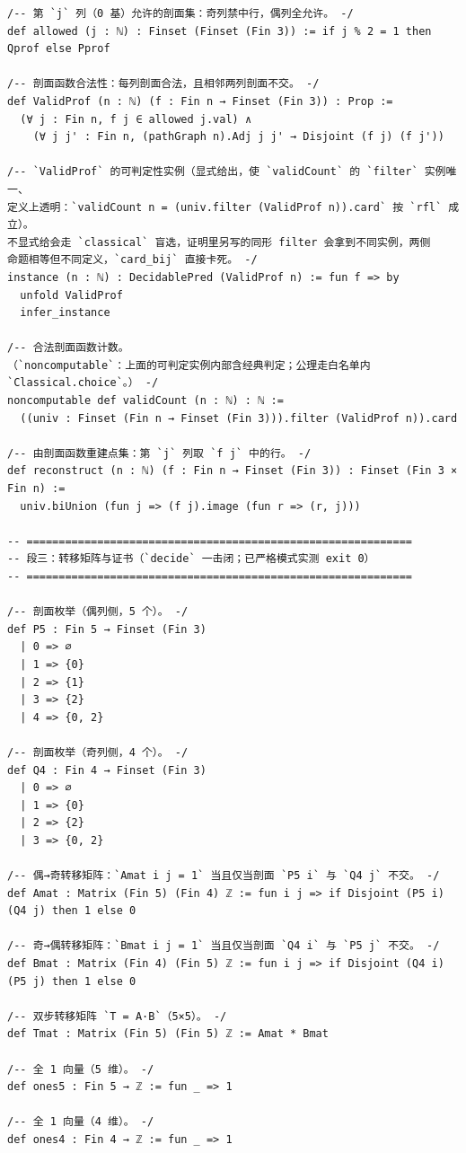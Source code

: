 \documentclass[11pt]{article}
\begin{document}
\begin{lstlisting}
/-- 第 `j` 列（0 基）允许的剖面集：奇列禁中行，偶列全允许。 -/
def allowed (j : ℕ) : Finset (Finset (Fin 3)) := if j % 2 = 1 then Qprof else Pprof

/-- 剖面函数合法性：每列剖面合法，且相邻两列剖面不交。 -/
def ValidProf (n : ℕ) (f : Fin n → Finset (Fin 3)) : Prop :=
  (∀ j : Fin n, f j ∈ allowed j.val) ∧
    (∀ j j' : Fin n, (pathGraph n).Adj j j' → Disjoint (f j) (f j'))

/-- `ValidProf` 的可判定性实例（显式给出，使 `validCount` 的 `filter` 实例唯一、
定义上透明：`validCount n = (univ.filter (ValidProf n)).card` 按 `rfl` 成立）。
不显式给会走 `classical` 盲选，证明里另写的同形 filter 会拿到不同实例，两侧
命题相等但不同定义，`card_bij` 直接卡死。 -/
instance (n : ℕ) : DecidablePred (ValidProf n) := fun f => by
  unfold ValidProf
  infer_instance

/-- 合法剖面函数计数。
（`noncomputable`：上面的可判定实例内部含经典判定；公理走白名单内 `Classical.choice`。） -/
noncomputable def validCount (n : ℕ) : ℕ :=
  ((univ : Finset (Fin n → Finset (Fin 3))).filter (ValidProf n)).card

/-- 由剖面函数重建点集：第 `j` 列取 `f j` 中的行。 -/
def reconstruct (n : ℕ) (f : Fin n → Finset (Fin 3)) : Finset (Fin 3 × Fin n) :=
  univ.biUnion (fun j => (f j).image (fun r => (r, j)))

-- ============================================================
-- 段三：转移矩阵与证书（`decide` 一击闭；已严格模式实测 exit 0）
-- ============================================================

/-- 剖面枚举（偶列侧，5 个）。 -/
def P5 : Fin 5 → Finset (Fin 3)
  | 0 => ∅
  | 1 => {0}
  | 2 => {1}
  | 3 => {2}
  | 4 => {0, 2}

/-- 剖面枚举（奇列侧，4 个）。 -/
def Q4 : Fin 4 → Finset (Fin 3)
  | 0 => ∅
  | 1 => {0}
  | 2 => {2}
  | 3 => {0, 2}

/-- 偶→奇转移矩阵：`Amat i j = 1` 当且仅当剖面 `P5 i` 与 `Q4 j` 不交。 -/
def Amat : Matrix (Fin 5) (Fin 4) ℤ := fun i j => if Disjoint (P5 i) (Q4 j) then 1 else 0

/-- 奇→偶转移矩阵：`Bmat i j = 1` 当且仅当剖面 `Q4 i` 与 `P5 j` 不交。 -/
def Bmat : Matrix (Fin 4) (Fin 5) ℤ := fun i j => if Disjoint (Q4 i) (P5 j) then 1 else 0

/-- 双步转移矩阵 `T = A·B`（5×5）。 -/
def Tmat : Matrix (Fin 5) (Fin 5) ℤ := Amat * Bmat

/-- 全 1 向量（5 维）。 -/
def ones5 : Fin 5 → ℤ := fun _ => 1

/-- 全 1 向量（4 维）。 -/
def ones4 : Fin 4 → ℤ := fun _ => 1


\end{lstlisting}
\end{document}
